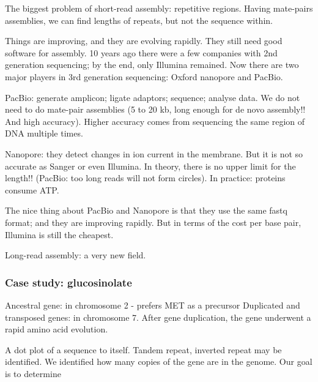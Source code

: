 \documentclass[main.tex]{subfiles}
\begin{document}
The biggest problem of short-read assembly: repetitive regions.
Having mate-pairs assemblies, we can find lengths of repeats, but not the sequence within.

Things are improving, and they are evolving rapidly. They still need good software for assembly. 10 years ago there were a few companies with 2nd generation sequencing; by the end, only Illumina remained. Now there are two major players in 3rd generation sequencing: Oxford nanopore and PacBio.

PacBio: generate amplicon; ligate adaptors; sequence; analyse data. We do not need to do mate-pair assemblies (5 to 20 kb, long enough for de novo assembly!! And high accuracy). Higher accuracy comes from sequencing the same region of DNA multiple times.

Nanopore: they detect changes in ion current in the membrane. But it is not so accurate as Sanger or even Illumina.
In theory, there is no upper limit for the length!! (PacBio: too long reads will not form circles).
In practice: proteins consume ATP.

The nice thing about PacBio and Nanopore is that they use the same fastq format; and they are improving rapidly. But in terms of the cost per base pair, Illumina is still the cheapest.

Long-read assembly: a very new field.

\subsubsection{Case study: glucosinolate}

Ancestral gene: in chromosome 2 - prefers MET as a precursor
Duplicated and transposed genes: in chromosome 7.
After gene duplication, the gene underwent a rapid amino acid evolution.

A dot plot of a sequence to itself.
Tandem repeat, inverted repeat may be identified.
We identified how many copies of the gene are in the genome. Our goal is to determine
\end{document}
